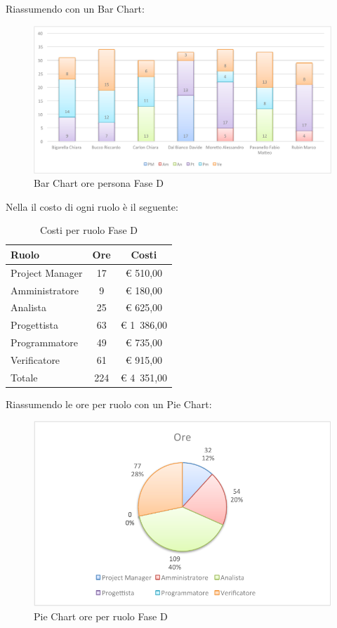 				Riassumendo con un Bar Chart:
				\begin{figure}[H]\centering
					\includegraphics[width=\textwidth]{PianoDiProgetto/Pics/ChartOreFaseD.pdf}
					\caption{Bar Chart ore persona Fase D}
				\end{figure}
				Nella  il costo di ogni ruolo è il seguente:
				\begin{table}[H]
					\begin{center}
						\begin{tabular}{| l | c | c |}
							\hline
							Ruolo 			& Ore 	& Costi  \\ \hline
							
							Project Manager	& 17 		& \euro{} 510,00 	\\
							Amministratore 		& 9 		& \euro{} 180,00 	\\
							Analista	 		& 25 		& \euro{} 625,00 	\\
							Progettista 		& 63 		& \euro{} 1~386,00  	\\
							Programmatore		& 49 		& \euro{} 735,00 	\\
							Verificatore		& 61 		& \euro{} 915,00 	\\ \hline \hline
							
							Totale	 		& 224 	& \euro{} 4~351,00 	\\ \hline
						\end{tabular}
					\end{center}
					\caption{Costi per ruolo Fase D}
				\end{table}
				Riassumendo le ore per ruolo con un Pie Chart:
				\begin{figure}[H]\centering
					\includegraphics[width=\textwidth]{PianoDiProgetto/Pics/ChartTotOreFaseD.pdf}
					\caption{Pie Chart ore per ruolo Fase D}
				\end{figure}
